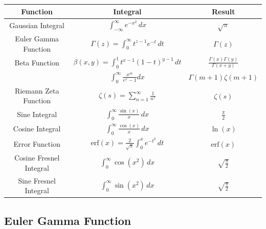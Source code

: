 \documentclass{article}
\begin{document}
\renewcommand{\arraystretch}{1.5}
\begin{center}
    \begin{tabular}{|c|c|c|}
        \hline
        \textbf{Function}       & \textbf{Integral}                                                  & \textbf{Result}                          \\
        \hline
        Gaussian Integral       & $\int_{-\infty}^{\infty} e^{-x^2} \, dx$                           & $\sqrt{\pi}$                             \\
        \hline
        Euler Gamma Function    & $\Gamma(z) = \int_{0}^{\infty} t^{z-1} e^{-t} \, dt$               & $\Gamma(z)$                              \\
        \hline
        Beta Function           & $\beta(x,y) = \int_{0}^{1} t^{x-1} (1-t)^{y-1} \, dt$              & $\frac{\Gamma(x)\Gamma(y)}{\Gamma(x+y)}$ \\
        \hline
                                & $\int_0^\infty \frac{x^m}{e^x-1}dx$                                & $\Gamma(m+1)\zeta(m+1)$                  \\
        \hline
        Riemann Zeta Function   & $\zeta(s) = \sum_{n=1}^{\infty} \frac{1}{n^s}$                     & $\zeta(s)$                               \\
        \hline
        Sine Integral           & $\int_{0}^{\infty} \frac{\sin(x)}{x} \, dx$                        & $\frac{\pi}{2}$                          \\
        \hline
        Cosine Integral         & $\int_{0}^{\infty} \frac{\cos(x)}{x} \, dx$                        & $\ln(x)$                                 \\
        \hline
        Error Function          & $\text{erf}(x) = \frac{2}{\sqrt{\pi}} \int_{0}^{x} e^{-t^2} \, dt$ & $\text{erf}(x)$                          \\
        \hline
        Cosine Fresnel Integral & $\int_{0}^{\infty} \cos(x^2) \, dx$                                & $\sqrt{\frac{\pi}{2}}$                   \\
        \hline
        Sine Fresnel Integral   & $\int_{0}^{\infty} \sin(x^2) \, dx$                                & $\sqrt{\frac{\pi}{2}}$                   \\
        \hline
    \end{tabular}
\end{center}

\subsection{Euler Gamma Function}
\end{document}
